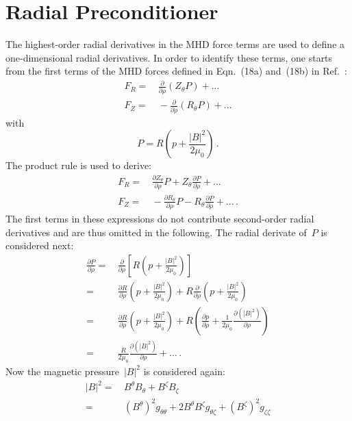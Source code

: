\section{Radial Preconditioner}
The highest-order radial derivatives in the MHD force terms
are used to define a one-dimensional radial derivatives.
%
In order to identify these terms,
one starts from the first terms of the MHD forces
defined in Eqn.~(18a) and~(18b) in Ref.~\cite{hirshman_whitson_1983}:
\begin{align}
 F_R =&\,  \frac{\partial}{\partial \rho} \left(Z_\theta P \right) + ... \\
 F_Z =&\, -\frac{\partial}{\partial \rho} \left(R_\theta P \right) + ...
\end{align}
with
\begin{equation}
 P = R \left( p + \frac{|B|^2}{2 \mu_0} \right) \, .
\end{equation}
%
The product rule is used to derive:
\begin{align}
 F_R =&\,  \frac{\partial Z_\theta}{\partial \rho} P + Z_\theta \frac{\partial P}{\partial \rho} + ... \\
 F_Z =&\, -\frac{\partial R_\theta}{\partial \rho} P - R_\theta \frac{\partial P}{\partial \rho} + ... \, .
\end{align}
%
The first terms in these expressions
do not contribute second-order radial derivatives
and are thus omitted in the following.
%
The radial derivate of~$P$ is considered next:
\begin{align}
 \frac{\partial P}{\partial \rho}
 =&\, \frac{\partial}{\partial \rho} \left[ R \left( p + \frac{|B|^2}{2 \mu_0} \right) \right] \nonumber \\
 =&\,   \frac{\partial R}{\partial \rho} \left( p + \frac{|B|^2}{2 \mu_0} \right)
      + R \frac{\partial}{\partial \rho} \left( p + \frac{|B|^2}{2 \mu_0} \right) \nonumber \\
 =&\,   \frac{\partial R}{\partial \rho} \left( p + \frac{|B|^2}{2 \mu_0} \right)
      + R \left(  \frac{\partial p}{\partial \rho}
                + \frac{1}{2 \mu_0} \frac{\partial (|B|^2)}{\partial \rho} \right) \nonumber \\
 =&\, \frac{R}{2 \mu_0} \frac{\partial (|B|^2)}{\partial \rho} + ... \, .
\end{align}
%
Now the magnetic pressure~$|B|^2$ is considered again:
\begin{align}
 |B|^2 =&\, B^\theta B_\theta + B^\zeta B_\zeta \\
 =&\,   (B^\theta)^2     g_{\theta \theta}
      + 2 B^\theta B^\zeta g_{\theta \zeta}
      + (B^\zeta)^2     g_{\zeta \zeta}
\end{align}
